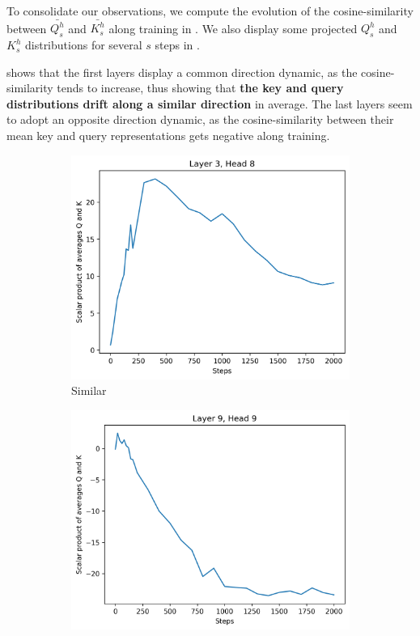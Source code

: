 To consolidate our observations, we compute the evolution of the cosine-similarity between $\bar{Q^h_s}$ and $\bar{K^h_s}$ along training in . We also display some projected $Q^h_s$ and $K^h_s$ distributions for several $s$ steps in .

 shows that the first layers display a common direction dynamic, as the cosine-similarity tends to increase, thus showing that \textbf{the key and query distributions drift along a similar direction} in average. The last layers seem to adopt an opposite direction dynamic, as the cosine-similarity between their mean key and query representations gets negative along training.

\begin{figure}[ht]
    \centering
    \begin{subfigure}[b]{0.48\columnwidth}
         \includegraphics[width=\linewidth]{sources/part_1/anisotropy/imgs/l3h8_scalar_QK.png}
         \caption{Similar}
         \label{fig:scalar_sim}
    \end{subfigure}
    \hfill
    \begin{subfigure}[b]{0.48\columnwidth}
         \includegraphics[width=\linewidth]{sources/part_1/anisotropy/imgs/l9h9_scalar_QK.png}

\end{subfigure}
\end{figure}

